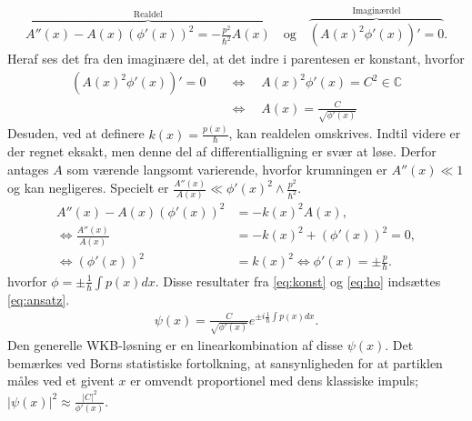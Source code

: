 \begin{align}
    \overbrace{A''(x) - A(x)\left( \phi'(x) \right)^{2} = - \frac{p^{2}}{\hbar^{2}}A(x)}^{\text{Realdel}} \quad \text{og} \quad%
    \overbrace{\left( A(x)^{2}\phi'(x) \right)' = 0}^{\text{Imaginærdel}}.
    \label{eq:realogimag}
\end{align}
Heraf ses det fra den imaginære del, at det indre i parentesen er konstant, hvorfor
\begin{align}
    \left( A(x)^{2}\phi'(x) \right)' = 0  \quad & \Leftrightarrow  \quad A(x)^{2}\phi'(x) = C^{2} \in \mathbb{C} \\
    & \Leftrightarrow  \quad A(x) = \frac{C}{\sqrt{\phi'(x)}}
    \label{eq:konst}
\end{align}
Desuden, ved at definere $k(x) = \frac{p(x)}{\hbar}$, kan realdelen omskrives. Indtil videre er der regnet eksakt, men denne del af differentialligning er svær at løse. Derfor antages $A$ som værende langsomt varierende, hvorfor krumningen er $A''(x)\ll 1$ og kan  negligeres. Specielt er $\frac{A''(x)}{A(x)} \ll \phi'(x)^{2}\wedge \frac{p^{2}}{\hbar^{2}}$.
\begin{align}
    A''(x) - A(x)(\phi'(x))^{2} & =  -k(x)^{2}A(x),\\
    \Leftrightarrow \frac{A''(x)}{A(x)} & = -k(x)^{2} + (\phi'(x))^{2} = 0, \\
    \Leftrightarrow \left(\phi'(x)\right)^{2} & = k(x)^{2} \Leftrightarrow  \phi'(x) = \pm \frac{p}{\hbar}.
    \label{eq:ho}
\end{align}
hvorfor $\phi = \pm \frac{1}{\hbar}\int p(x) dx$. Disse resultater fra \cref{eq:konst} og \cref{eq:ho} indsættes \cref{eq:ansatz}.
\begin{align}
    \psi(x) = \frac{C}{\sqrt{\phi'(x)}}e^{\pm i\frac{1}{\hbar}\int p(x) dx}.
    \label{eqpsi}
\end{align}
Den generelle WKB-løsning er en linearkombination af disse $\psi(x)$. Det bemærkes ved Borns statistiske fortolkning, at sansynligheden for at partiklen måles ved et givent $x$ er omvendt proportionel med dens klassiske impuls; $|\psi(x)|^2 \approx \frac{|C|^2}{\phi'(x)}$.


